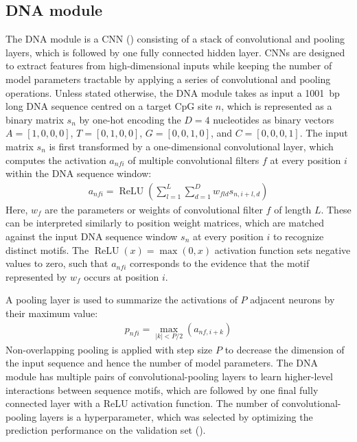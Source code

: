 \subsection{DNA module}

The DNA module is a CNN () consisting of a stack of convolutional and pooling layers, which is followed by one fully connected hidden layer. CNNs are designed to extract features from high-dimensional inputs while keeping the number of model parameters tractable by applying a series of convolutional and pooling operations. Unless stated otherwise, the DNA module takes as input a 1001~bp long DNA sequence centred on a target CpG site $n$, which is represented as a binary matrix $s_n$ by one-hot encoding the $D=4$ nucleotides as binary vectors $A=[1, 0, 0, 0]$, $T=[0, 1, 0, 0]$, $G=[0, 0, 1, 0]$, and $C=[0, 0, 0, 1]$. The input matrix $s_n$ is first transformed by a one-dimensional convolutional layer, which computes the activation $a_{nfi}$ of multiple convolutional filters $f$ at every position $i$ within the DNA sequence window:
\begin{align} \label{eq:dcpg_filter_act}
  a_{nfi}=\operatorname{ReLU}(\sum_{l=1}^L \sum_{d=1}^D w_{fld} s_{n,i+l,d})
\end{align}
Here, $w_f$  are the parameters or weights of convolutional filter $f$ of length $L$. These can be interpreted similarly to position weight matrices, which are matched against the input DNA sequence window $s_n$ at every position $i$ to recognize distinct motifs. The $\operatorname{ReLU}(x)=\max(0,x)$ activation function sets negative values to zero, such that $a_{nfi}$ corresponds to the evidence that the motif represented by $w_f$ occurs at position $i$.

A pooling layer is used to summarize the activations of $P$ adjacent neurons by their maximum value:
\begin{align}
  p_{nfi}=\max_{|k|<P/2}(a_{nf,i+k})
\end{align}
Non-overlapping pooling is applied with step size $P$ to decrease the dimension of the input sequence and hence the number of model parameters. The DNA module has multiple pairs of convolutional-pooling layers to learn higher-level interactions between sequence motifs, which are followed by one final fully connected layer with a ReLU activation function. The number of convolutional-pooling layers is a hyperparameter, which was selected by optimizing the prediction performance on the validation set ().


